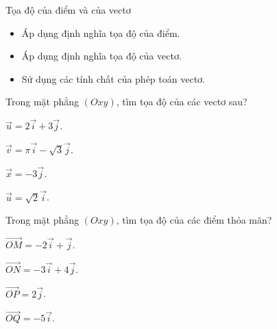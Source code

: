 \begin{dang}{Tọa độ của điểm và của vectơ}
    \begin{itemize}
    \item Áp dụng định nghĩa tọa độ của điểm.
    \item Áp dụng định nghĩa tọa độ của vectơ.
    \item Sử dụng các tính chất của phép toán vectơ.
\end{itemize}
\end{dang}
\begin{vd}%
    Trong mặt phẳng $(Oxy)$, tìm tọa độ của các vectơ sau?
    \begin{listEX}[2]
        \item $\overrightarrow{u}=2\overrightarrow{i}+3\overrightarrow{j}$.
        \item $\overrightarrow{v}=\pi\overrightarrow{i}-\sqrt{3}\overrightarrow{j}$.
        \item $\overrightarrow{x}=-3\overrightarrow{j}$.
        \item $\overrightarrow{u}=\sqrt{2}\overrightarrow{i}$.
    \end{listEX}
\end{vd}
\begin{vd}%
    Trong mặt phẳng $(Oxy)$, tìm tọa độ của các điểm thỏa mãn?
    \begin{listEX}[2]
        \item $\overrightarrow{OM}=-2\overrightarrow{i}+\overrightarrow{j}$.
        \item $\overrightarrow{ON}=-3\overrightarrow{i}+4\overrightarrow{j}$.
        \item $\overrightarrow{OP}=2\overrightarrow{j}$.
        \item $\overrightarrow{OQ}=-5\overrightarrow{i}$.
    \end{listEX}
\end{vd}

